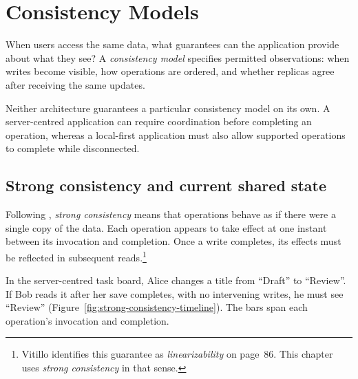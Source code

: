 \section{Consistency Models}
\label{sec:consistency-models}

When users access the same data, what guarantees can the application provide about what they see?
A \emph{consistency model} specifies permitted observations: when writes become visible, how operations are ordered, and whether replicas agree after receiving the same updates.
\parencite[Section~10.3]{understanding-distributed-systems}

Neither architecture guarantees a particular consistency model on its own.
A server-centred application can require coordination before completing an operation, whereas a local-first application must also allow supported operations to complete while disconnected.

\subsection{Strong consistency and current shared state}

Following \textcite[85]{understanding-distributed-systems}, \emph{strong consistency} means that operations behave as if there were a single copy of the data.
Each operation appears to take effect at one instant between its invocation and completion.
Once a write completes, its effects must be reflected in subsequent reads.\footnote{Vitillo identifies this guarantee as \emph{linearizability} on page~86.
	This chapter uses \emph{strong consistency} in that sense.}

In the server-centred task board, Alice changes a title from \enquote{Draft} to \enquote{Review}.
If Bob reads it after her save completes, with no intervening writes, he must see \enquote{Review} (Figure~\ref{fig:strong-consistency-timeline}).
The bars span each operation's invocation and completion.

\begin{illustration}[htbp]
	\centering
	\caption{A read following a completed write under strong consistency, assuming no intervening writes}
	\label{fig:strong-consistency-timeline}
	\begingroup
	
	\endgroup
\end{illustration}
\FloatBarrier

